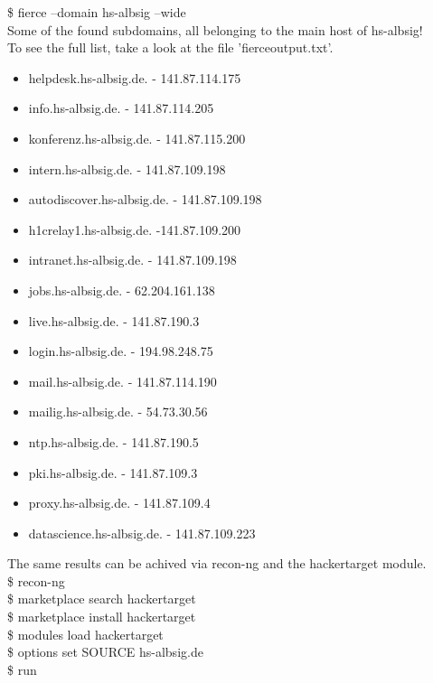 \documentclass[a4paper,10pt]{article}
\begin{document}
\noindent\$\raisebox{-0.9ex}{\~{}} fierce   --domain hs-albsig --wide\\
Some of the found subdomains, all belonging to the main host of hs-albsig!\\
To see the full list, take a look at the file 'fierceoutput.txt'.  
\\
\begin{itemize}
 \item helpdesk.hs-albsig.de. - 141.87.114.175
 \item info.hs-albsig.de. - 141.87.114.205
 \item konferenz.hs-albsig.de. - 141.87.115.200
 \item intern.hs-albsig.de. - 141.87.109.198
 \item autodiscover.hs-albsig.de. - 141.87.109.198
 \item h1crelay1.hs-albsig.de. -141.87.109.200
 \item intranet.hs-albsig.de. - 141.87.109.198
 \item jobs.hs-albsig.de. - 62.204.161.138
 \item live.hs-albsig.de. - 141.87.190.3
 \item login.hs-albsig.de. - 194.98.248.75
 \item mail.hs-albsig.de. - 141.87.114.190
 \item mailig.hs-albsig.de. - 54.73.30.56
 \item ntp.hs-albsig.de. - 141.87.190.5
 \item pki.hs-albsig.de. - 141.87.109.3
 \item proxy.hs-albsig.de. - 141.87.109.4
 \item datascience.hs-albsig.de. - 141.87.109.223
  

\end{itemize}

\vspace{10mm}
\noindent The same results can be achived via recon-ng and the hackertarget module.\\
\newline
\noindent\$\raisebox{-0.9ex}{\~{}} recon-ng\\
\$\raisebox{-0.9ex}{\~{}} marketplace search hackertarget\\
\$\raisebox{-0.9ex}{\~{}} marketplace install hackertarget\\
\$\raisebox{-0.9ex}{\~{}} modules load hackertarget\\ 
\$\raisebox{-0.9ex}{\~{}} options set SOURCE hs-albsig.de\\
\$\raisebox{-0.9ex}{\~{}} run
\end{document}
